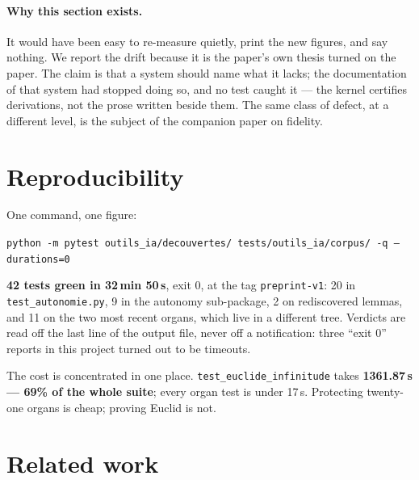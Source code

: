 \documentclass[11pt]{article}
\theoremstyle{remark}\newtheorem{remark}{Remark}
\begin{document}
\paragraph{Why this section exists.} It would have been easy to re-measure quietly, print
the new figures, and say nothing. We report the drift because it is the paper's own thesis
turned on the paper. The claim is that a system should name what it lacks; the
documentation of that system had stopped doing so, and no test caught it --- the kernel
certifies derivations, not the prose written beside them. The same class of defect, at a
different level, is the subject of the companion paper on fidelity.

\section{Reproducibility}
\label{sec:repro}

One command, one figure:

\begin{center}
\texttt{python -m pytest outils\_ia/decouvertes/ tests/outils\_ia/corpus/ -q --durations=0}
\end{center}

\textbf{42 tests green in 32\,min 50\,s}, exit 0, at the tag \texttt{preprint-v1}: 20 in
\texttt{test\_autonomie.py}, 9 in the autonomy sub-package, 2 on rediscovered lemmas, and
11 on the two most recent organs, which live in a different tree. Verdicts are read off
the last line of the output file, never off a notification: three ``exit 0'' reports in
this project turned out to be timeouts.

The cost is concentrated in one place. \texttt{test\_euclide\_infinitude} takes
\textbf{1361.87\,s --- 69\% of the whole suite}; every organ test is under 17\,s.
Protecting twenty-one organs is cheap; proving Euclid is not.

\section{Related work}
\label{sec:related}
\end{document}
